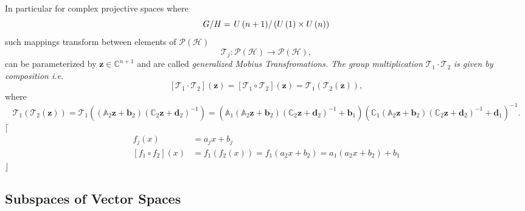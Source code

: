 \documentclass[aps,preprint]{revtex4}%
\begin{document}
In particular for complex projective spaces where
\begin{equation}
G/H=\left.  U\left(  n+1\right)  \right/  \left(  U\left(  1\right)  \times
U\left(  n\right)  \right)
\end{equation}
such mappings transform between elements of $\mathcal{P}\left(  \mathcal{H}%
\right)  $%
\begin{equation}
\mathcal{T}_{j}:\mathcal{P}\left(  \mathcal{H}\right)  \rightarrow
\mathcal{P}\left(  \mathcal{H}\right)  ,
\end{equation}
can be parameterized by $\mathbf{z\in}\mathbb{C}^{n+1}$ and are called
\emph{generalized Mobius Transfromations. The group multiplication
}$\mathcal{T}_{1}\cdot\mathcal{T}_{2}$ \emph{is given by composition i.e. }%
\begin{equation}
\left[  \mathcal{T}_{1}\cdot\mathcal{T}_{2}\right]  \left(  \mathbf{z}\right)
=\left[  \mathcal{T}_{1}\circ\mathcal{T}_{2}\right]  \left(  \mathbf{z}%
\right)  =\mathcal{T}_{1}\left(  \mathcal{T}_{2}\left(  \mathbf{z}\right)
\right)  ,
\end{equation}
where
\begin{equation}
\mathcal{T}_{1}\left(  \mathcal{T}_{2}\left(  \mathbf{z}\right)  \right)
=\mathcal{T}_{1}\left(  \left(  \mathbb{A}_{2}\mathbf{z+b}_{2}\right)  \left(
\mathbb{C}_{2}\mathbf{z+d}_{2}\right)  ^{-1}\right)  =\left(  \mathbb{A}%
_{1}\left(  \mathbb{A}_{2}\mathbf{z+b}_{2}\right)  \left(  \mathbb{C}%
_{2}\mathbf{z+d}_{2}\right)  ^{-1}+\mathbf{b}_{1}\right)  \left(
\mathbb{C}_{1}\left(  \mathbb{A}_{2}\mathbf{z+b}_{2}\right)  \left(
\mathbb{C}_{2}\mathbf{z+d}_{2}\right)  ^{-1}+\mathbf{d}_{1}\right)  ^{-1}.
\end{equation}
$\lceil$%
\begin{align}
f_{j}\left(  x\right)   &  =a_{j}x+b_{j}\\
\left[  f_{1}\circ f_{2}\right]  \left(  x\right)   &  =f_{1}\left(
f_{2}\left(  x\right)  \right)  =f_{1}\left(  a_{2}x+b_{2}\right)
=a_{1}\left(  a_{2}x+b_{2}\right)  +b_{1}%
\end{align}
$\rfloor$

\subsection{Subspaces of Vector Spaces}
\end{document}
